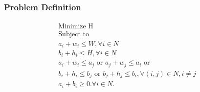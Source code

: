 \begin{frame}[fragile]
    \frametitle{Problem Definition}
    \framesubtitle{}

    \begin{eqnarray}
    \text{Minimize H}\nonumber \\
    \text{Subject to}\nonumber \\
    a_{i} + w_{i} \leq W, \forall i \in N \\
    b_{i} + h_{i} \leq H, \forall i \in N \\
    a_{i} + w_{i} \leq a_{j}\text{ or }a_{j} + w_{j} \leq a_{i}\text{ or }\nonumber\\
    b_{i} + h_{i} \leq b_{j}\text{ or }b_{j} + h_{j} \leq b_{i}, \forall (i,j) \in N, i\neq j\\
    a_{i} + b_{i} \geq 0. \forall i \in N.
    \end{eqnarray}

\end{frame}
